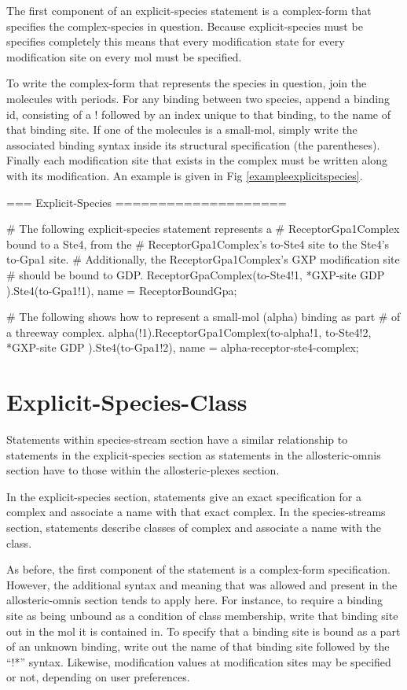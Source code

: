 The first component of an explicit-species statement is a complex-form
that specifies the complex-species in question.  Because
explicit-species must be specifies completely this means that every
modification state for every modification site on every mol must be
specified.  

To write the complex-form that represents the species in question,
join the molecules with periods.  For any binding between two species,
append a binding id, consisting of a ! followed by an index unique to
that binding, to the name of that binding site.  If one of the molecules is
a small-mol, simply write the associated binding syntax inside its
structural specification (the parentheses).  Finally each modification
site that exists in the complex must be written along with its
modification.  An example is given in Fig
\ref{exampleexplicitspecies}.

\begin{ExampleMZR}[label=exampleexplicitspecies]
=== Explicit-Species ====================

    # The following explicit-species statement represents a
    # ReceptorGpa1Complex bound to a Ste4, from the
    # ReceptorGpa1Complex's to-Ste4 site to the Ste4's to-Gpa1 site.
    # Additionally, the ReceptorGpa1Complex's GXP modification site
    # should be bound to GDP.
    ReceptorGpaComplex(to-Ste4!1, *GXP-site { GDP } ).Ste4(to-Gpa1!1), 
        name = ReceptorBoundGpa;

    # The following shows how to represent a small-mol (alpha) binding as part
    # of a threeway complex.
    alpha(!1).ReceptorGpa1Complex(to-alpha!1, to-Ste4!2, *GXP-site {GDP} ).Ste4(to-Gpa1!2),
        name = alpha-receptor-ste4-complex;
\end{ExampleMZR}


\section{Explicit-Species-Class}
Statements within species-stream section have a similar relationship
to statements in the explicit-species section as statements in the
allosteric-omnis section have to those within the allosteric-plexes section.

In the explicit-species section, statements give an exact
specification for a complex and associate a name with that exact
complex.  In the species-streams section, statements describe classes
of complex and associate a name with the class.

As before, the first component of the statement is a complex-form
specification.  However, the additional syntax and meaning that was
allowed and present in the allosteric-omnis section tends to apply
here.  For instance, to require a binding site as being unbound as a
condition of class membership, write that binding site out in the mol
it is contained in.  To specify that a binding site is bound as a part
of an unknown binding, write out the name of that binding site
followed by the ``!*'' syntax. Likewise, modification values at
modification sites may be specified or not, depending on user
preferences.  

